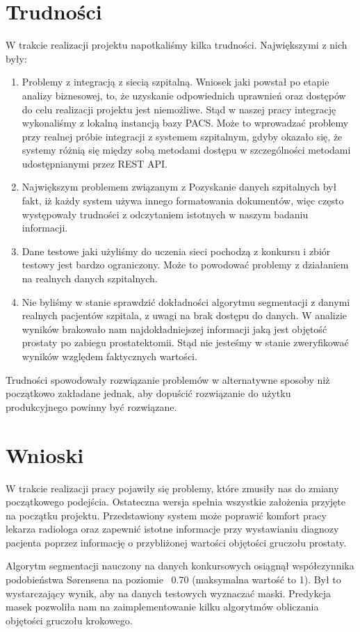 \documentclass[a4paper,11pt,twoside]{report}
\theoremstyle{definition}
\begin{document}
\section{Trudności}
W trakcie realizacji projektu napotkaliśmy kilka trudności. Największymi z nich były:
\begin{enumerate}
\item Problemy z integracją z siecią szpitalną. Wniosek jaki powstał po etapie analizy biznesowej, to, że uzyskanie odpowiednich uprawnień oraz dostępów do celu realizacji projektu jest niemożliwe. Stąd w naszej pracy integrację wykonaliśmy z lokalną instancją bazy PACS. Może to wprowadzać problemy przy realnej próbie integracji z systemem szpitalnym, gdyby okazało się, że systemy różnią się między sobą metodami dostępu w szczególności metodami udostępnianymi przez REST API.
\item  Największym problemem związanym z Pozyskanie danych szpitalnych był fakt, iż każdy system używa innego formatowania dokumentów, więc często występowały trudności z odczytaniem istotnych w naszym badaniu informacji.
\item Dane testowe jaki użyliśmy do uczenia sieci pochodzą z konkursu i zbiór testowy jest bardzo ograniczony. Może to powodować problemy z działaniem na realnych danych szpitalnych. 
\item Nie byliśmy w stanie sprawdzić dokładności algorytmu segmentacji z danymi realnych pacjentów szpitala, z uwagi na brak dostępu do danych. W analizie wyników brakowało nam najdokładniejszej informacji jaką jest objętość prostaty po zabiegu prostatektomii. Stąd nie jesteśmy w stanie zweryfikować wyników względem faktycznych wartości.
\end{enumerate}
Trudności spowodowały rozwiązanie problemów w alternatywne sposoby niż początkowo zakładane jednak, aby dopuścić rozwiązanie do użytku produkcyjnego powinny być rozwiązane. 

\section{Wnioski}
W trakcie realizacji pracy pojawiły się problemy, które zmusiły nas do zmiany początkowego podejścia. Ostateczna wersja spełnia wszystkie założenia przyjęte na początku projektu. Przedstawiony system może poprawić komfort pracy lekarza radiologa oraz zapewnić istotne informacje przy wystawianiu diagnozy pacjenta poprzez informację o przybliżonej wartości objętości gruczołu prostaty. 

\par 
Algorytm segmentacji nauczony na danych konkursowych osiągnął współczynnika podobieństwa Sørensena na poziomie ~0.70 (maksymalna wartość to 1). Był to wystarczający wynik, aby na danych testowych wyznaczać maski. Predykcja masek pozwoliła nam na zaimplementowanie kilku algorytmów obliczania objętości gruczołu krokowego.
\end{document}
